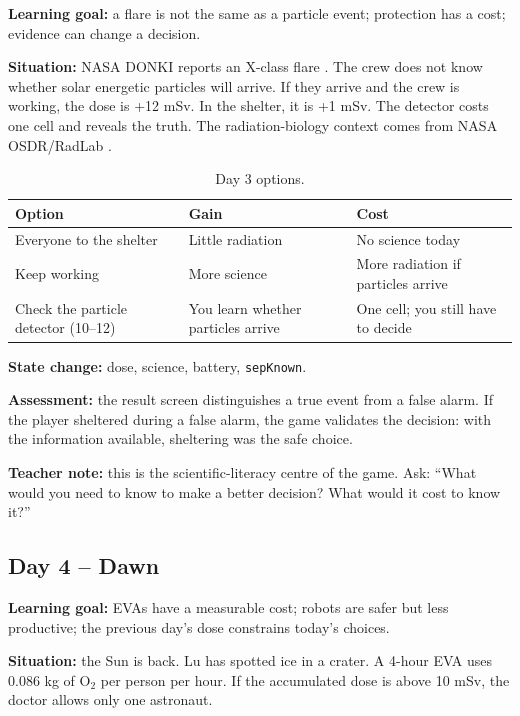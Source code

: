 \documentclass[11pt,a4paper]{article}
\newcommand{\code}[1]{\texttt{#1}}
\begin{document}
\textbf{Learning goal:} a flare is not the same as a particle event; protection has a cost; evidence can change a decision.

\textbf{Situation:} NASA DONKI reports an X-class flare \cite{donki}. The crew does not know whether solar energetic particles will arrive. If they arrive and the crew is working, the dose is +12 mSv. In the shelter, it is +1 mSv. The detector costs one cell and reveals the truth. The radiation-biology context comes from NASA OSDR/RadLab \cite{osdr}.

\begin{table}[H]
\centering
\small
\begin{tabular}{@{}p{4.2cm}p{4.6cm}p{5.6cm}@{}}
\toprule
\textbf{Option} & \textbf{Gain} & \textbf{Cost}\\
\midrule
Everyone to the shelter & Little radiation & No science today\\
Keep working & More science & More radiation if particles arrive\\
Check the particle detector (10--12) & You learn whether particles arrive & One cell; you still have to decide\\
\bottomrule
\end{tabular}
\caption{Day 3 options.}
\label{tab:day3}
\end{table}

\textbf{State change:} dose, science, battery, \code{sepKnown}.

\textbf{Assessment:} the result screen distinguishes a true event from a false alarm. If the player sheltered during a false alarm, the game validates the decision: with the information available, sheltering was the safe choice.

\textbf{Teacher note:} this is the scientific-literacy centre of the game. Ask: ``What would you need to know to make a better decision? What would it cost to know it?''

\subsection{Day 4 -- Dawn}

\textbf{Learning goal:} EVAs have a measurable cost; robots are safer but less productive; the previous day's dose constrains today's choices.

\textbf{Situation:} the Sun is back. Lu has spotted ice in a crater. A 4-hour EVA uses 0.086 kg of O$_2$ per person per hour. If the accumulated dose is above 10 mSv, the doctor allows only one astronaut.
\end{document}
